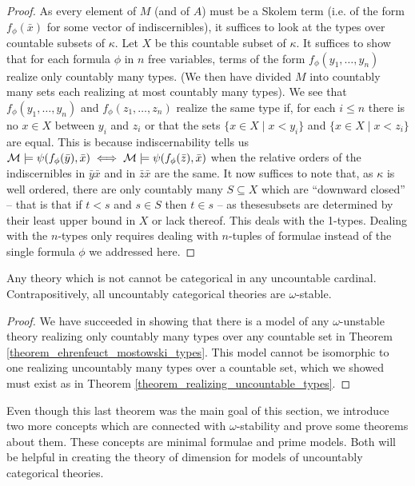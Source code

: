 \begin{proof}
As every element of \(M\) (and of \(A\)) must be a Skolem term (i.e. of the form \(f_\phi(\bar{x})\) for some vector of indiscernibles), it suffices to look at the types over countable subsets of \(\kappa\).
Let \(X\) be this countable subset of \(\kappa\). 
It suffices to show that for each formula \(\phi\) in \(n\) free variables, terms of the form \(f_\phi(y_1, \ldots, y_n)\) realize only countably many types. 
(We then have divided \(M\) into countably many sets each realizing at most countably many types).
We see that \(f_\phi(y_1, \ldots, y_n)\) and \(f_\phi(z_1, \ldots, z_n)\) realize the same type if, for each \(i \leq n\) there is no \(x \in X\) between \(y_i\) and \(z_i\) or that the sets \(\{x \in X \mid x < y_i\}\) and \(\{x \in X \mid x < z_i\}\) are equal. 
This is because indiscernability tells us \(\mathcal{M} \models \psi(f_\phi(\bar{y}), \bar{x}) \iff \mathcal{M} \models \psi(f_\phi(\bar{z}), \bar{x})\) when the relative orders of the indiscernibles in \(\bar{y}\bar{x}\) and in \(\bar{z}\bar{x}\) are the same. 
It now suffices to note that, as \(\kappa\) is well ordered, there are only countably many \(S \subseteq X\) which are ``downward closed'' -- that is that if \(t < s\) and \(s \in S\) then \(t \in s\) -- as thesesubsets are determined by their least upper bound in \(X\) or lack thereof.
This deals with the 1-types. Dealing with the \(n\)-types only requires dealing with \(n\)-tuples of formulae instead of the single formula \(\phi\) we addressed here. 
\end{proof}

\begin{theorem}\label{theorem_omega_stability_categoricity}
Any theory which is not \omst cannot be categorical in any uncountable cardinal. Contrapositively, all uncountably categorical theories are \(\omega\)-stable.
\end{theorem}

\begin{proof}
We have succeeded in showing that there is a model of any \(\omega\)-unstable theory realizing only countably many types over any countable set in Theorem \ref{theorem_ehrenfeuct_mostowski_types}.
This model cannot be isomorphic to one realizing uncountably many types over a countable set, which we showed must exist as in Theorem \ref{theorem_realizing_uncountable_types}.
\end{proof}

Even though this last theorem was the main goal of this section, we introduce two more concepts which are connected with \(\omega\)-stability and prove some theorems about them. These concepts are minimal formulae and prime models. 
Both will be helpful in creating the theory of dimension for models of uncountably categorical theories. 

